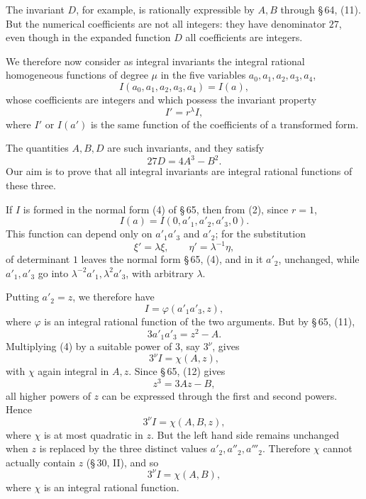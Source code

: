 \documentclass[11pt]{article}
\begin{document}
The invariant $D$, for example, is rationally expressible by $A,B$ through \S\,64, (11). But the numerical coefficients are not all integers: they have denominator $27$, even though in the expanded function $D$ all coefficients are integers.

We therefore now consider as integral invariants the integral rational homogeneous functions of degree $\mu$ in the five variables $a_0,a_1,a_2,a_3,a_4$,
\begin{equation}
 I(a_0,a_1,a_2,a_3,a_4)=I(a),
\tag{1}
\end{equation}
whose coefficients are integers and which possess the invariant property
\begin{equation}
 I'=r^\lambda I,
\tag{2}
\end{equation}
where $I'$ or $I(a')$ is the same function of the coefficients of a transformed form.

The quantities $A,B,D$ are such invariants, and they satisfy
\begin{equation}
 27D=4A^3-B^2.
\tag{3}
\end{equation}
Our aim is to prove that all integral invariants are integral rational functions of these three.

If $I$ is formed in the normal form (4) of \S\,65, then from (2), since $r=1$,
\[
 I(a)=I(0,a'_1,a'_2,a'_3,0).
\]
This function can depend only on $a'_1a'_3$ and $a'_2$; for the substitution
\[
 \xi'=\lambda\xi,
 \qquad
 \eta'=\lambda^{-1}\eta,
\]
of determinant $1$ leaves the normal form \S\,65, (4), and in it $a'_2$, unchanged, while $a'_1,a'_3$ go into $\lambda^{-2}a'_1,\lambda^2a'_3$, with arbitrary $\lambda$.

Putting $a'_2=z$, we therefore have
\begin{equation}
 I=\varphi(a'_1a'_3,z),
\tag{4}
\end{equation}
where $\varphi$ is an integral rational function of the two arguments. But by \S\,65, (11),
\[
 3a'_1a'_3=z^2-A.
\]
Multiplying (4) by a suitable power of $3$, say $3^\nu$, gives
\begin{equation}
 3^\nu I=\chi(A,z),
\tag{5}
\end{equation}
with $\chi$ again integral in $A,z$. Since \S\,65, (12) gives
\[
 z^3=3Az-B,
\]
all higher powers of $z$ can be expressed through the first and second powers. Hence
\begin{equation}
 3^\nu I=\chi(A,B,z),
\tag{6}
\end{equation}
where $\chi$ is at most quadratic in $z$. But the left hand side remains unchanged when $z$ is replaced by the three distinct values $a'_2,a''_2,a'''_2$. Therefore $\chi$ cannot actually contain $z$ (\S\,30, II), and so
\begin{equation}
 3^\nu I=\chi(A,B),
\tag{7}
\end{equation}
where $\chi$ is an integral rational function.
\end{document}

